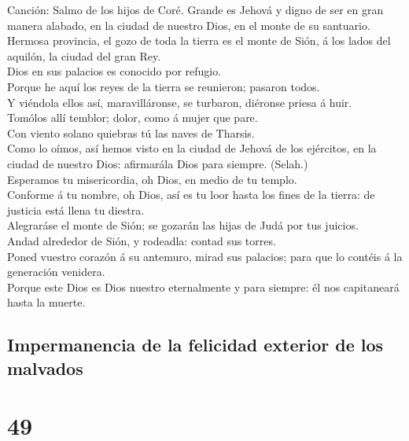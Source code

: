  Canción: Salmo de los hijos de Coré. Grande es Jehová y
digno de ser en gran manera alabado, en la ciudad de nuestro Dios, en el
monte de su santuario.\\
 Hermosa provincia, el gozo de toda la tierra es el monte
de Sión, á los lados del aquilón, la ciudad del gran Rey.\\
 Dios en sus palacios es conocido por refugio.\\
 Porque he aquí los reyes de la tierra se reunieron;
pasaron todos.\\
 Y viéndola ellos así, maravilláronse, se turbaron,
diéronse priesa á huir.\\
 Tomólos allí temblor; dolor, como á mujer que pare.\\
 Con viento solano quiebras tú las naves de Tharsis.\\
 Como lo oímos, así hemos visto en la ciudad de Jehová de
los ejércitos, en la ciudad de nuestro Dios: afirmarála Dios para
siempre. (Selah.)\\
 Esperamos tu misericordia, oh Dios, en medio de tu
templo.\\
 Conforme á tu nombre, oh Dios, así es tu loor hasta los
fines de la tierra: de justicia está llena tu diestra.\\
 Alegraráse el monte de Sión; se gozarán las hijas de
Judá por tus juicios.\\
 Andad alrededor de Sión, y rodeadla: contad sus
torres.\\
 Poned vuestro corazón á su antemuro, mirad sus palacios;
para que lo contéis á la generación venidera.\\
 Porque este Dios es Dios nuestro eternalmente y para
siempre: él nos capitaneará hasta la muerte.

\hypertarget{impermanencia-de-la-felicidad-exterior-de-los-malvados}{%
\subsection{Impermanencia de la felicidad exterior de los
malvados}\label{impermanencia-de-la-felicidad-exterior-de-los-malvados}}

\hypertarget{section-19-49}{%
\section{49}\label{section-19-49}}

